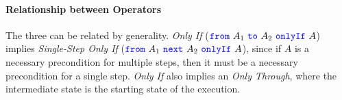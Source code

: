 \paragraph{Relationship between \Nec Operators}
The three \Nec {} %
can be related by generality. 
\emph{Only If} (${\color{blue}\texttt{from}}\ A_1\ {\color{blue}\texttt{to}}\ A_2\ {\color{blue}\texttt{onlyIf}}\ A$) implies
  \emph{Single-Step Only If} (${\color{blue}\texttt{from}}\ A_1\ {\color{blue}\texttt{next}}\ A_2\ {\color{blue}\texttt{onlyIf}}\ A$), since if $A$ is 
a necessary precondition for multiple steps, then it must be a necessary 
precondition for a single step. \emph{Only If} also implies 
an \emph{Only Through}, where the intermediate state is the starting state
of the execution.

